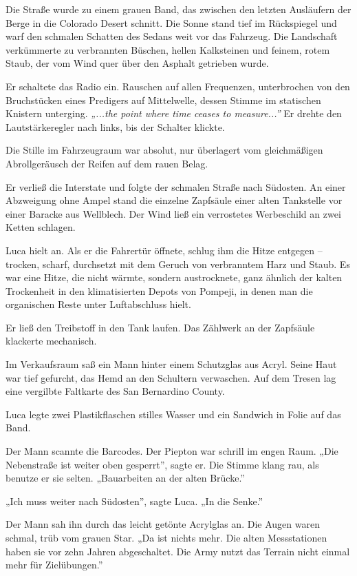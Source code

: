 \documentclass[
  ngerman,
]{article}
\begin{document}
Die Straße wurde zu einem grauen Band, das zwischen den letzten
Ausläufern der Berge in die Colorado Desert schnitt. Die Sonne stand
tief im Rückspiegel und warf den schmalen Schatten des Sedans weit vor
das Fahrzeug. Die Landschaft verkümmerte zu verbrannten Büschen, hellen
Kalksteinen und feinem, rotem Staub, der vom Wind quer über den Asphalt
getrieben wurde.

Er schaltete das Radio ein. Rauschen auf allen Frequenzen, unterbrochen
von den Bruchstücken eines Predigers auf Mittelwelle, dessen Stimme im
statischen Knistern unterging. \emph{„...the point where time ceases to
measure...''} Er drehte den Lautstärkeregler nach links, bis der
Schalter klickte.

Die Stille im Fahrzeugraum war absolut, nur überlagert vom gleichmäßigen
Abrollgeräusch der Reifen auf dem rauen Belag.

Er verließ die Interstate und folgte der schmalen Straße nach Südosten.
An einer Abzweigung ohne Ampel stand die einzelne Zapfsäule einer alten
Tankstelle vor einer Baracke aus Wellblech. Der Wind ließ ein
verrostetes Werbeschild an zwei Ketten schlagen.

Luca hielt an. Als er die Fahrertür öffnete, schlug ihm die Hitze
entgegen -- trocken, scharf, durchsetzt mit dem Geruch von verbranntem
Harz und Staub. Es war eine Hitze, die nicht wärmte, sondern
austrocknete, ganz ähnlich der kalten Trockenheit in den klimatisierten
Depots von Pompeji, in denen man die organischen Reste unter
Luftabschluss hielt.

Er ließ den Treibstoff in den Tank laufen. Das Zählwerk an der Zapfsäule
klackerte mechanisch.

Im Verkaufsraum saß ein Mann hinter einem Schutzglas aus Acryl. Seine
Haut war tief gefurcht, das Hemd an den Schultern verwaschen. Auf dem
Tresen lag eine vergilbte Faltkarte des San Bernardino County.

Luca legte zwei Plastikflaschen stilles Wasser und ein Sandwich in Folie
auf das Band.

Der Mann scannte die Barcodes. Der Piepton war schrill im engen Raum.
„Die Nebenstraße ist weiter oben gesperrt'', sagte er. Die Stimme klang
rau, als benutze er sie selten. „Bauarbeiten an der alten Brücke.''

„Ich muss weiter nach Südosten'', sagte Luca. „In die Senke.''

Der Mann sah ihn durch das leicht getönte Acrylglas an. Die Augen waren
schmal, trüb vom grauen Star. „Da ist nichts mehr. Die alten
Messstationen haben sie vor zehn Jahren abgeschaltet. Die Army nutzt das
Terrain nicht einmal mehr für Zielübungen.''
\end{document}

